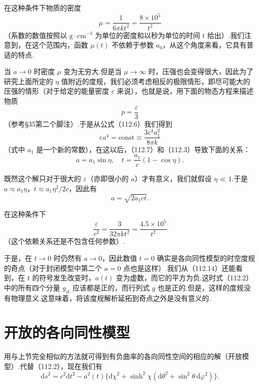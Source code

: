 在这种条件下物质的密度
\begin{equation}
  \mu=\frac{1}{6\pi kt^{2}}=\frac{8\times10^{5}}{t^{2}}
\end{equation}
（系数的数值按照以 $\mathrm{g\cdot cm^{-3}}$ 为单位的密度和以秒为单位的时间 $t$ 给出）.我们注意到，在这个范围内，函数 $\mu(t)$ 不依赖于参数 $a_{0}$，从这个角度来看，它具有普适的特点.

当 $a\to0$ 时密度 $\mu$ 变为无穷大.但是当 $\mu\to\infty$ 时，压强也会变得很大，因此为了研究上面所定的 $\eta$ 值附近的度规，我们必须考虑相反的极限情形，即尽可能大的压强的情形（对于给定的能量密度 $\varepsilon$ 来说），也就是说，用下面的物态方程来描述物质
\begin{equation*}
  p=\frac{\varepsilon}{3}
\end{equation*}
（参考§35第二个脚注）.于是从公式（112.6）我们得到
\begin{equation}
  \varepsilon a^{4}=\mathrm{const}\equiv\frac{3c^{4}a_{1}^{2}}{8\pi k}
\end{equation}
（式中 $a_{1}$ 是一个新的常数），在这以后，（112.7）和（112.3）导致下面的关系：
\begin{equation*}
  a=a_{1}\sin\eta,\quad t=\frac{a_{1}}{c}(1-\cos\eta).
\end{equation*}

既然这个解只对于很大的 $\varepsilon$（亦即很小的 $a$）才有意义，我们就假设 $\eta\ll1$.于是 $a\approx a_{1}\eta$，$t\approx a_{1}\eta^{2}/2c$，因此有
\begin{equation}
  a=\sqrt{2a_{1}ct}.
\end{equation}

在这种条件下
\begin{equation}
  \frac{\varepsilon}{c^{2}}=\frac{3}{32\pi kt^{2}}
  =\frac{4.5\times10^{5}}{t^{2}}
\end{equation}
（这个依赖关系还是不包含任何参数）.

于是，在 $t\to0$ 时仍然有 $a\to0$，因此数值 $t=0$ 确实是各向同性模型的时空度规的奇点（对于封闭模型中第二个 $a=0$ 点也是这样）.我们从（112.14）还能看到，在 $t$ 的符号发生改变时，$a(t)$ 变为虚数，而它的平方为负.这时式（112.2）中的所有四个分量 $g_{ik}$ 应该都是正的，而行列式 $g$ 也是正的.但是，这样的度规没有物理意义.这意味着，将该度规解析延拓到奇点之外是没有意义的.

\section{开放的各向同性模型}

用与上节完全相似的方法就可得到有负曲率的各向同性空间的相应的解（开放模型）.代替（112.2），现在我们有
\begin{equation}
  \mathrm{d}s^{2}=c^{2}\mathrm{d}t^{2}
  -a^{2}(t)\{\mathrm{d}\chi^{2}
  +\sinh^{2}\chi(\mathrm{d}\theta^{2}+\sin^{2}\theta\,\mathrm{d}\varphi^{2})\}.
\end{equation}

